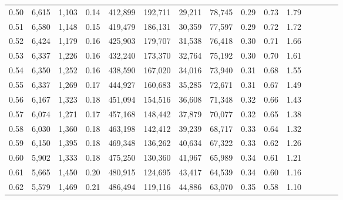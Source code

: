 \begin{tabular}{rrrcrrrrrrrrrrr}
0.50 &   6,615 &  1,103 &                                       0.14 &  412,899 &  192,711 &   29,211 &   78,745 &  0.29 &  0.73 &                         1.79 \\
0.51 &   6,580 &  1,148 &                                       0.15 &  419,479 &  186,131 &   30,359 &   77,597 &  0.29 &  0.72 &                         1.72 \\
0.52 &   6,424 &  1,179 &                                       0.16 &  425,903 &  179,707 &   31,538 &   76,418 &  0.30 &  0.71 &                         1.66 \\
0.53 &   6,337 &  1,226 &                                       0.16 &  432,240 &  173,370 &   32,764 &   75,192 &  0.30 &  0.70 &                         1.61 \\
0.54 &   6,350 &  1,252 &                                       0.16 &  438,590 &  167,020 &   34,016 &   73,940 &  0.31 &  0.68 &                         1.55 \\
0.55 &   6,337 &  1,269 &                                       0.17 &  444,927 &  160,683 &   35,285 &   72,671 &  0.31 &  0.67 &                         1.49 \\
0.56 &   6,167 &  1,323 &                                       0.18 &  451,094 &  154,516 &   36,608 &   71,348 &  0.32 &  0.66 &                         1.43 \\
0.57 &   6,074 &  1,271 &                                       0.17 &  457,168 &  148,442 &   37,879 &   70,077 &  0.32 &  0.65 &                         1.38 \\
0.58 &   6,030 &  1,360 &                                       0.18 &  463,198 &  142,412 &   39,239 &   68,717 &  0.33 &  0.64 &                         1.32 \\
0.59 &   6,150 &  1,395 &                                       0.18 &  469,348 &  136,262 &   40,634 &   67,322 &  0.33 &  0.62 &                         1.26 \\
0.60 &   5,902 &  1,333 &                                       0.18 &  475,250 &  130,360 &   41,967 &   65,989 &  0.34 &  0.61 &                         1.21 \\
0.61 &   5,665 &  1,450 &                                       0.20 &  480,915 &  124,695 &   43,417 &   64,539 &  0.34 &  0.60 &                         1.16 \\
0.62 &   5,579 &  1,469 &                                       0.21 &  486,494 &  119,116 &   44,886 &   63,070 &  0.35 &  0.58 &                         1.10 \\

\end{tabular}
